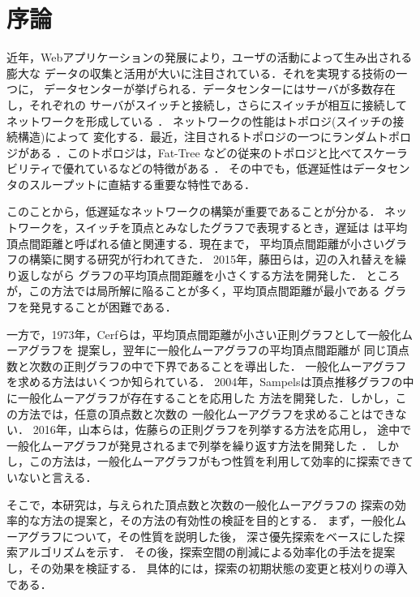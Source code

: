
\chapter{序論}
近年，Webアプリケーションの発展により，ユーザの活動によって生み出される膨大な
データの収集と活用が大いに注目されている．それを実現する技術の一つに，
データセンターが挙げられる．データセンターにはサーバが多数存在し，それぞれの
サーバがスイッチと接続し，さらにスイッチが相互に接続してネットワークを形成している
\cite{Greenberg2009,Al-Fares2008}．
ネットワークの性能はトポロジ(スイッチの接続構造)によって
変化する．最近，注目されるトポロジの一つにランダムトポロジがある
\cite{Singla2011,Koibuchi2012}．このトポロジは，Fat-Tree\cite{Al-Fares2008}
などの従来のトポロジと比べてスケーラビリティで優れているなどの特徴がある
\cite{Singla2011}．
その中でも，低遅延性はデータセンタのスループットに直結する重要な特性である．

このことから，低遅延なネットワークの構築が重要であることが分かる．
ネットワークを，スイッチを頂点とみなしたグラフで表現するとき，遅延は
は平均頂点間距離と呼ばれる値と関連する．現在まで，
平均頂点間距離が小さいグラフの構築に関する研究が行われてきた．
2015年，藤田らは，辺の入れ替えを繰り返しながら
グラフの平均頂点間距離を小さくする方法を開発した\cite{Fujita2015}．
ところが，この方法では局所解に陥ることが多く，平均頂点間距離が最小である
グラフを発見することが困難である．

一方で，1973年，Cerfらは，平均頂点間距離が小さい正則グラフとして一般化ムーアグラフを
提案し\cite{Cerf1973}，翌年に一般化ムーアグラフの平均頂点間距離が
同じ頂点数と次数の正則グラフの中で下界であることを導出した\cite{Cerf1974Lower}．
一般化ムーアグラフを求める方法はいくつか知られている．
2004年，Sampelsは頂点推移グラフの中に一般化ムーアグラフが存在することを応用した
方法を開発した\cite{Sampels2004}．しかし，この方法では，任意の頂点数と次数の
一般化ムーアグラフを求めることはできない．
2016年，山本らは，佐藤らの正則グラフを列挙する方法\cite{Sato2008}を応用し，
途中で一般化ムーアグラフが発見されるまで列挙を繰り返す方法を開発した
\cite{Yamamoto2016}．
しかし，この方法は，一般化ムーアグラフがもつ性質を利用して効率的に探索できて
いないと言える．

そこで，本研究は，与えられた頂点数と次数の一般化ムーアグラフの
探索の効率的な方法の提案と，その方法の有効性の検証を目的とする．
まず，一般化ムーアグラフについて，その性質を説明した後，
深さ優先探索をベースにした探索アルゴリズムを示す．
その後，探索空間の削減による効率化の手法を提案し，その効果を検証する．
具体的には，探索の初期状態の変更と枝刈りの導入である．

